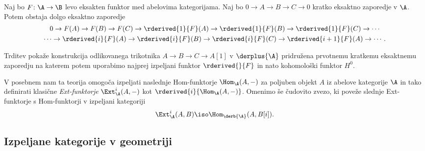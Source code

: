 \begin{trditev}
    Naj bo $F \colon \A \to \B$ levo eksakten funktor med abelovima kategorijama. Naj bo $0 \to A \to B \to C \to 0$ kratko eksaktno zaporedje v $\A$. Potem obstaja dolgo eksaktno zaporedje 
    \begin{multline*}
        0 \to F(A) \to F(B) \to F(C) \to \rderived{1}{F}(A) \to \rderived{1}{F}(B) \to \rderived{1}{F}(C) \to \cdots \\
        \cdots \to \rderived{i}{F}(A) \to \rderived{i}{F}(B) \to \rderived{i}{F}(C) \to \rderived{i+1}{F}(A) \to \cdots.
    \end{multline*}
\end{trditev}
Trditev pokaže konstrukcija odlikovanega trikotnika $A \to B \to C \to A[1]$ v $\derplus{\A}$ pridružena prvotnemu kratkemu eksaktnemu zaporedju na katerem potem uporabimo najprej izpeljani funktor $\rderived{}{F}$ in nato kohomološki funktor $H^0$.

V posebnem nam ta teorija omogoča izpeljati naslednje Hom-funktorje $\Hom_\A(A, -)$ za poljuben objekt $A$ iz abelove kategorije $\A$ in tako definirati klasične \emph{Ext-funktorje} $\Ext^i_\A(A, -)$ kot $\rderived{i}{\Hom_\A(A,-)}$. Omenimo še čudovito zvezo, ki poveže slednje Ext-funktorje s Hom-funktorji v izpeljani kategoriji
\[
    \Ext^i_\A(A, B) \iso \Hom_{\derb{\A}}(A, B[i]).
\]    




\subsection*{Izpeljane kategorije v geometriji}

